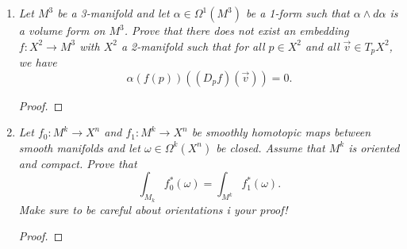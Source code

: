 \documentclass{article}
\begin{document}
\begin{enumerate}[label={\bf Q\arabic*:}]
\begin{proof}
      Let $v_1,\ldots,v_n$ be a basis of the tangent space $T_eG$. Then the
      $n$ vector fields $dL_g(v_1),\ldots,dL_g(v_n)\in T_gG$ are linearly
      independent at $g\in M$: First, note that each $dL_g(v_i)$ is a smooth
      vector field from the smoothness of the group operations. Now since
      $L_g$ is a diffeomorphism, $dL_g$ is an isomorphism. Then since
      $v_1,\ldots,v_n$ form a basis of $T_eG$, their images
      $dL_g(v_1),\ldots,dL_g(v_n)$ form a basis of $T_gG$. \\

      So the map $\phi:G\times \mathbb{R}^n\rightarrow TG$ defined by
      $\phi((g,V))=(g,dL_g)_e(V)$ is a smooth vector-bundle isomorphism,
      thus $TG\cong G\times\mathbb{R}^n$.
    \end{proof}

  \item \it Let $M^3$ be a 3-manifold and let $\alpha\in\Omega^1(M^3)$ be a
    1-form such that $\alpha\wedge d\alpha$ is a volume form on $M^3$.
    Prove that there does not exist an embedding $f:X^2\rightarrow M^3$
    with $X^2$ a 2-manifold such that for all $p\in X^2$ and all
    $\vec{v}\in T_pX^2$, we have
    \[\alpha(f(p))((D_pf)(\vec{v}))=0.\]

    \begin{proof}
    \end{proof}

  \item \it Let $f_0:M^k\rightarrow X^n$ and $f_1:M^k\rightarrow X^n$ be
    smoothly homotopic maps between smooth manifolds and let
    $\omega\in\Omega^k(X^n)$ be closed. Assume that $M^k$ is oriented and
    compact. Prove that
    \[\int_{M_k} f_0^*(\omega)= \int_{M^k} f_1^*(\omega).\]
    Make sure to be careful about orientations i your proof!

    \begin{proof}
    \end{proof}
\end{enumerate}
\end{document}
